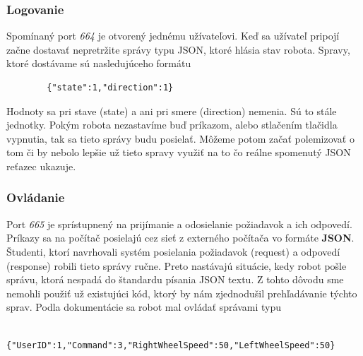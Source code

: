\subsubsection{Logovanie}

Spomínaný port \textit{664} je otvorený jednému užívateľovi. Keď sa užívateľ pripojí začne dostavať nepretržite správy typu JSON, ktoré hlásia stav robota. Spravy,
ktoré dostávame sú nasledujúceho formátu
\begin{lstlisting}
		{"state":1,"direction":1}
\end{lstlisting}
Hodnoty sa pri stave (state) a ani pri smere (direction) nemenia. Sú to stále jednotky. Pokým robota nezastavíme buď príkazom, alebo stlačením tlačidla vypnutia,
tak sa tieto správy budu posielať. Môžeme potom začať polemizovať o tom či by nebolo lepšie už tieto spravy využiť na to čo reálne spomenutý JSON reťazec ukazuje.

\subsubsection{Ovládanie}

Port \textit{665} je sprístupnený na prijímanie a odosielanie požiadavok a ich odpovedí. Príkazy sa na počítač posielajú cez sieť z externého počítača vo formáte
\textbf{JSON}. Študenti, ktorí navrhovali systém posielania požiadavok (request) a odpovedí (response) robili tieto správy ručne. Preto nastávajú situácie, kedy
robot pošle správu, ktorá nespadá do štandardu písania JSON textu. Z tohto dôvodu sme nemohli použiť už existujúci kód, ktorý by nám zjednodušil prehľadávanie
týchto sprav. Podla dokumentácie sa robot mal ovládať správami typu~\cite{BMdoc}

\label{jsonSpeedRequestBad}
\begin{lstlisting}
		{"UserID":1,"Command":3,"RightWheelSpeed":50,"LeftWheelSpeed":50}
\end{lstlisting}

